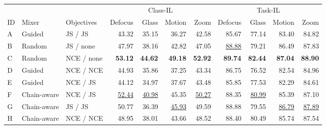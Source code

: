 \begin{center}
\begin{minipage}{\textwidth}
\centering\small
\setlength{\tabcolsep}{6pt}
\begin{tabular}{lllrrrrrrrr}
\toprule
 &  &  & \multicolumn{4}{c}{Class-IL} & \multicolumn{4}{c}{Task-IL} \\
ID & Mixer & Objectives & Defocus & Glass & Motion & Zoom & Defocus & Glass & Motion & Zoom \\
\midrule
A & Guided & JS / JS & 43.32 & 35.15 & 36.27 & 42.58 & 85.67 & 77.14 & 83.40 & 84.82 \\
B & Random & JS / none & 47.97 & 38.16 & 42.82 & 47.05 & \underline{88.88} & 79.21 & 86.49 & 87.83 \\
C & Random & NCE / none & \textbf{53.12} & \textbf{44.62} & \textbf{49.18} & \textbf{52.92} & \textbf{89.74} & \textbf{82.44} & \textbf{87.04} & \textbf{88.90} \\
D & Guided & NCE / NCE & 44.93 & 35.86 & 37.25 & 43.34 & 86.75 & 76.52 & 82.54 & 84.96 \\
E & Guided & NCE / JS & 44.12 & 34.97 & 37.67 & 43.48 & 85.85 & 77.53 & 82.29 & 84.61 \\
\rowcolor{ourrow} F & Chain-aware & NCE / JS & \underline{52.44} & \underline{40.98} & 45.35 & \underline{50.27} & 88.35 & \underline{80.99} & 85.39 & 87.10 \\
G & Chain-aware & JS / JS & 50.77 & 36.39 & \underline{45.93} & 49.59 & 88.88 & 79.55 & \underline{86.79} & \underline{87.89} \\
H & Chain-aware & NCE / NCE & 48.95 & 38.01 & 43.66 & 48.52 & 88.40 & 80.49 & 85.74 & 87.54 \\
\bottomrule
\end{tabular}
\end{minipage}
\end{center}
\clearpage
